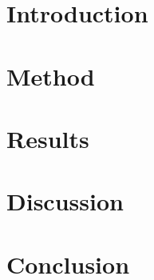\documentclass[a4paper,fleqn]{cas-sc}
\begin{document}
\section{Introduction}


\FloatBarrier

\section{Method}

\FloatBarrier

\section{Results}

\FloatBarrier

\section{Discussion}

\FloatBarrier

\section{Conclusion}

\FloatBarrier

\FloatBarrier

\acresetall



\end{document}
